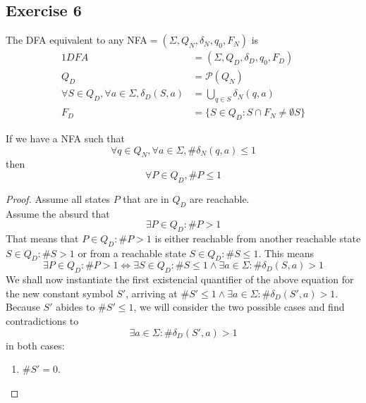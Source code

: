 \documentclass[docid=TP03]{tcom_TP}
\begin{document}
{\subsection{Exercise 6}
The DFA equivalent to any NFA$=(\Sigma,Q_N,\delta_N,q_0,F_N)$ is
\begin{alignat}{1}
	DFA &= (\Sigma, Q_D, \delta_D, {q_0}, F_D)\\
	Q_D &= \mathscr{P}(Q_N)\\
	\forall S \in Q_D, \forall a \in \Sigma, \delta_D(S,a)&=\bigcup_{q\in S}{\delta_N(q,a)} \label{eq:NFA_DFA_trans}\\
	F_D &= \{S\in Q_D: S \cap F_N \neq \emptyset S\}
\end{alignat}
\begin{lemma} \label{lem:NFA_DFA}
	If we have a NFA such that
	\begin{equation}
	\label{lem:NFA}
		\forall q \in Q_N, \forall a \in \Sigma, \#\delta_N(q,a)\leq 1
	\end{equation}
	then
	\begin{equation}
		\forall P \in Q_D, \#P \leq 1
	\end{equation}
\end{lemma}
\begin{proof}
	Assume all states $P$ that are in $Q_D$ are reachable.\\
	Assume the absurd that
	\begin{equation} \label{eq:absurd_NFA}
		\exists P \in Q_D\colon\#P > 1
	\end{equation}
	That means that $P\in Q_D \colon \#P > 1$ is either reachable from another reachable state $S\in Q_D\colon\#S>1$ or from a reachable state $S\in Q_D\colon\#S\leq 1$. This means
	\begin{equation}
		\exists P \in Q_D\colon\#P>1
		\iff \exists S \in Q_D\colon \#S\leq 1 \wedge \exists a \in \Sigma\colon \#\delta_D(S,a)>1
	\end{equation}
	We shall now instantiate the first existencial quantifier of the above equation for the new constant symbol $S'$, arriving at $\#S'\leq 1 \wedge \exists a \in \Sigma\colon \#\delta_D(S',a)>1$. Because $S'$ abides to $\#S'\leq 1$, we will consider the two possible cases and find contradictions 
to
	\begin{equation} \label{eq:absurd_NFA_2}
		\exists a \in \Sigma\colon \#\delta_D(S',a)>1
	\end{equation}
	in both cases:
	\begin{enumerate}
		\item $\#S'=0$.

\end{enumerate}
\end{proof}}
\end{document}
